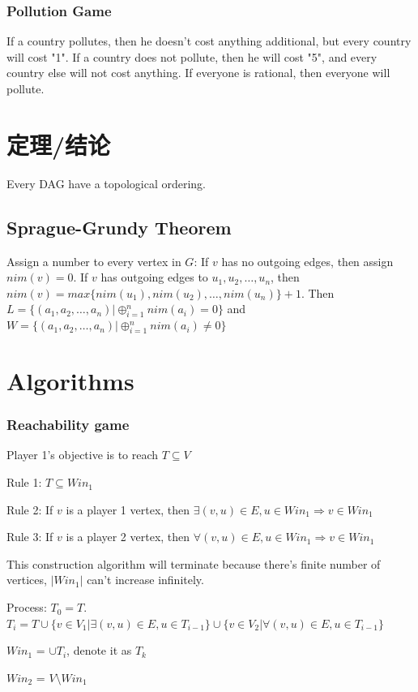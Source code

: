\documentclass[12pt,a4paper]{ctexrep}
\begin{document}
\subsubsection{Pollution Game}
If a country pollutes, then he doesn't cost anything additional, but every country will cost "1". If a country does not pollute, then he will cost "5", and every country else will not cost anything. If everyone is rational, then everyone will pollute.

\section{定理/结论}
Every DAG have a topological ordering.

\subsection{Sprague-Grundy Theorem}
Assign a number to every vertex in $G$: If $v$ has no outgoing edges, then assign $nim(v) = 0$. If $v$ has outgoing edges to $u_1,u_2,\dots,u_n$, then $nim(v) = max\{nim(u_1),nim(u_2),\dots, nim(u_n)\}+1$. Then $L = \{(a_1,a_2,\dots,a_n)|\oplus_{i=1}^n nim(a_i) = 0\}$ and $W = \{(a_1,a_2,\dots,a_n)|\oplus_{i=1}^n nim(a_i) \neq 0\}$

\section{Algorithms}
\subsubsection{Reachability game}
Player 1's objective is to reach $T \subseteq V$

Rule 1: $T \subseteq Win_1$

Rule 2: If $v$ is a player 1 vertex, then $\exists (v,u) \in E, u \in Win_1 \Rightarrow v \in Win_1$

Rule 3: If $v$ is a player 2 vertex, then $\forall (v,u) \in E, u \in Win_1 \Rightarrow v \in Win_1$

This construction algorithm will terminate because there's finite number of vertices, $|Win_1|$ can't increase infinitely.

Process: $T_0 = T$. $T_i = T \cup \{v \in V_1|\exists (v,u)\in E, u \in T_{i-1}\} \cup \{v \in V_2| \forall (v,u)\in E, u \in T_{i-1}\}$

$Win_1$ = $\cup T_i$, denote it as $T_k$

$Win_2$ = $V \setminus Win_1$
\end{document}
